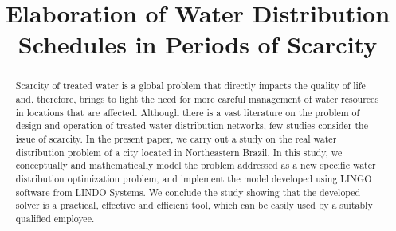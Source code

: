 \documentclass{singlecol}
\theoremstyle{TH}{
\newtheorem{lemma}{Lemma}
\newtheorem{theorem}[lemma]{Theorem}
\newtheorem{corrolary}[lemma]{Corrolary}
\newtheorem{conjecture}[lemma]{Conjecture}
\newtheorem{proposition}[lemma]{Proposition}
\newtheorem{claim}[lemma]{Claim}
\newtheorem{stheorem}[lemma]{Wrong Theorem}
\newtheorem{algorithm}{Algorithm}
}
\theoremstyle{THrm}{
\newtheorem{definition}{Definition}[section]
\newtheorem{question}{Question}[section]
\newtheorem{remark}{Remark}
\newtheorem{scheme}{Scheme}
}
\theoremstyle{THhit}{
\newtheorem{case}{Case}[section]
}
\begin{document}
%


\newpage

\setcounter{page}{1}






\BottomCatch

\CLline

\subtitle{}

\title{Elaboration of Water Distribution Schedules in Periods of Scarcity}

%
%
%
%
%
%
%
%
%
%
%
%

\begin{abstract}

Scarcity of treated water is a global problem that directly impacts the quality of life and, therefore, brings to light the need for more careful management of water resources in locations that are affected. Although there is a vast literature on the problem of design and operation of treated water distribution networks, few studies consider the issue of scarcity. In the present paper, we carry out a study on the real water distribution problem of a city located in Northeastern Brazil. In this study, we conceptually and mathematically model the problem addressed as a new specific water distribution optimization problem, and implement the model developed using LINGO software from LINDO Systems. We conclude the study showing that the developed solver is a practical, effective and efficient tool, which can be easily used by a suitably qualified employee.
\end{abstract}
\end{document}
